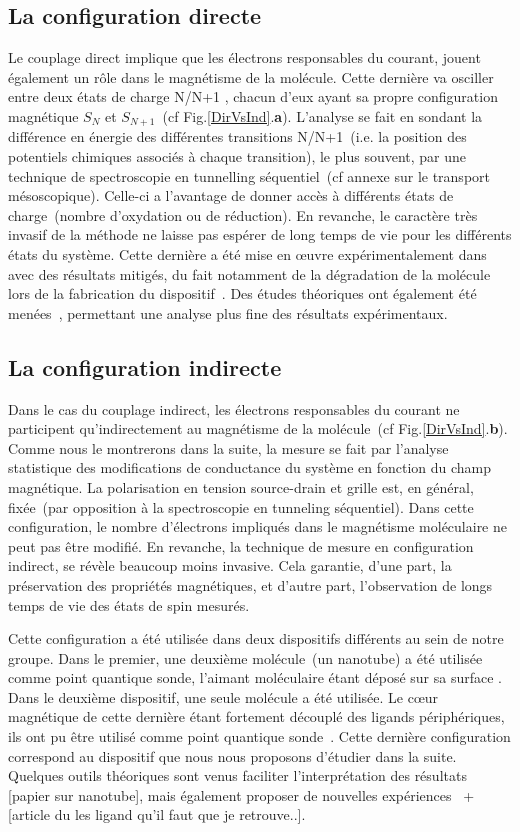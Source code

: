 \subsection{La configuration directe}
Le couplage direct implique que les électrons responsables du courant, jouent également un rôle dans le magnétisme de la molécule. Cette dernière va osciller entre deux états de charge N/N+1 , chacun d'eux ayant sa propre configuration magnétique $S_N$ et $S_{N+1}$~(cf Fig.\ref{DirVsInd}.\textbf{a}). L'analyse se fait en sondant la différence en énergie des différentes transitions N/N+1~(i.e. la position des potentiels chimiques associés à chaque transition), le plus souvent, par une technique de spectroscopie en tunnelling séquentiel~(cf annexe sur le transport mésoscopique). Celle-ci a l'avantage de donner accès à différents états de charge~(nombre d'oxydation ou de réduction). En revanche, le caractère très invasif de la méthode ne laisse pas espérer de long temps de vie pour les différents états du système. Cette dernière a été mise en œuvre expérimentalement dans \cite{Heersche2006,Jo2006,Zyazin2010} avec des résultats mitigés, du fait notamment de la dégradation de la molécule lors de la fabrication du dispositif~\cite{Jo2006}. Des études théoriques ont également été menées~\cite{Timm2006,Timm2007}, permettant une analyse plus fine des résultats expérimentaux.

\subsection{La configuration indirecte}

Dans le cas du couplage indirect, les électrons responsables du courant ne participent qu'indirectement au magnétisme de la molécule~(cf Fig.\ref{DirVsInd}.\textbf{b}). Comme nous le montrerons dans la suite, la mesure se fait par l'analyse statistique des modifications de conductance du système en fonction du champ magnétique. La polarisation en tension source-drain et grille est, en général, fixée~(par opposition à la spectroscopie en tunneling séquentiel). Dans cette configuration, le nombre d'électrons impliqués dans le magnétisme moléculaire ne peut pas être modifié. En revanche, la technique de mesure en configuration indirect, se révèle beaucoup moins invasive. Cela garantie, d'une part, la préservation des propriétés magnétiques, et d'autre part, l'observation de longs temps de vie des états de spin mesurés. 

Cette configuration a été utilisée dans deux dispositifs différents au sein de notre groupe. Dans le premier, une deuxième molécule~(un nanotube) a été utilisée comme point quantique sonde, l'aimant moléculaire étant déposé sur sa surface \cite{Urdampilleta2011}. Dans le deuxième dispositif, une seule molécule a été utilisée. Le cœur magnétique de cette dernière étant fortement découplé des ligands périphériques, ils ont pu être utilisé comme point quantique sonde~\cite{Vincent2012}. Cette dernière configuration correspond au dispositif que nous nous proposons d'étudier dans la suite. Quelques outils théoriques sont venus faciliter l'interprétation des résultats [papier sur nanotube], mais également proposer de nouvelles expériences~\cite{Jaafar2010} +[article du les ligand qu'il faut que je retrouve..].


